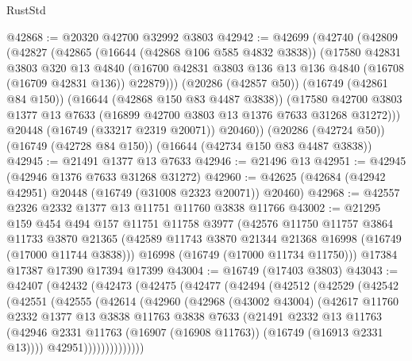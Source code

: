 \begin{lexlean}{RustStd}
\begin{coremodule}
@42868 := @20320 @42700 @32992 @3803
@42942 := @42699
    (@42740
      (@42809
        (@42827
          (@42865
            (@16644 (@42868 @106 @585 @4832 @3838))
            (@17580
              @42831
              @3803
              @320
              @13
              @4840
              (@16700 @42831 @3803 @136 @13 @136 @4840 (@16708 (@16709 @42831 @136)) @22879)))
          (@20286 (@42857 @50))
          (@16749 (@42861 @84 @150))
          (@16644 (@42868 @150 @83 @4487 @3838))
          (@17580 @42700 @3803 @1377 @13 @7633 (@16899 @42700 @3803 @13 @1376 @7633 @31268 @31272)))
        @20448
        (@16749 (@33217 @2319 @20071))
        @20460))
    (@20286 (@42724 @50))
    (@16749 (@42728 @84 @150))
    (@16644 (@42734 @150 @83 @4487 @3838))
@42945 := @21491 @1377 @13 @7633
@42946 := @21496 @13
@42951 := @42945 (@42946 @1376 @7633 @31268 @31272)
@42960 := @42625 (@42684 (@42942 @42951) @20448 (@16749 (@31008 @2323 @20071)) @20460)
@42968 := @42557 @2326 @2332 @1377 @13 @11751 @11760 @3838 @11766
@43002 := @21295
    @159
    @454
    @494
    @157
    @11751
    @11758
    @3977
    (@42576
      @11750
      @11757
      @3864
      @11733
      @3870
      @21365
      (@42589 @11743 @3870 @21344 @21368 @16998 (@16749 (@17000 @11744 @3838)))
      @16998
      (@16749 (@17000 @11734 @11750)))
    @17384
    @17387
    @17390
    @17394
    @17399
@43004 := @16749 (@17403 @3803)
@43043 := @42407
    (@42432
      (@42473
        (@42475
          (@42477
            (@42494
              (@42512
                (@42529
                  (@42542
                    (@42551
                      (@42555
                        (@42614
                          (@42960
                            (@42968
                              (@43002 @43004)
                              (@42617
                                @11760
                                @2332
                                @1377
                                @13
                                @3838
                                @11763
                                @3838
                                @7633
                                (@21491
                                  @2332
                                  @13
                                  @11763
                                  (@42946
                                    @2331
                                    @11763
                                    (@16907 (@16908 @11763))
                                    (@16749 (@16913 @2331 @13))))
                                @42951))))))))))))))

\end{coremodule}
\end{lexlean}
